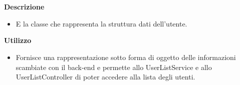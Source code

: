         \textbf{\\ \\ Descrizione} 
          \begin{itemize}
            \item[] E la classe che rappresenta la struttura dati dell'utente.
          \end{itemize}      
        \textbf{Utilizzo}  
          \begin{itemize}
            \item[] Fornisce una rappresentazione sotto forma di oggetto delle informazioni scambiate con il back-end e permette allo UserListService e allo UserListController di poter accedere alla lista degli utenti.
          \end{itemize}